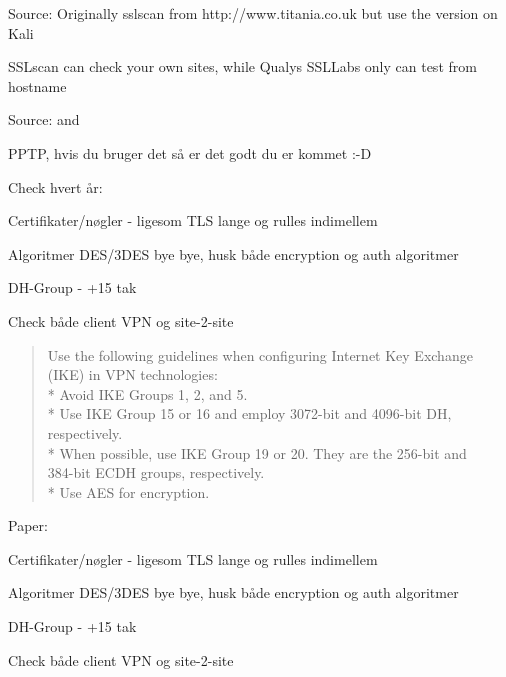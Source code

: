 \documentclass[Screen16to9,17pt]{foils}
\begin{document}
Source:
Originally sslscan from http://www.titania.co.uk
 but use the version on Kali

SSLscan can check your own sites, while Qualys SSLLabs only can test from hostname





Source:  and \\




\begin{list1}
\item PPTP, hvis du bruger det så er det godt du er kommet :-D
\item Check hvert år:
\begin{list2}
\item Certifikater/nøgler - ligesom TLS lange og rulles indimellem
\item Algoritmer DES/3DES bye bye, husk både encryption og auth algoritmer
\item DH-Group - +15 tak
\item Check både client VPN og site-2-site
\end{list2}
\end{list1}


\begin{quote}
  Use the following guidelines when configuring Internet Key Exchange (IKE) in VPN technologies:\\
* Avoid IKE Groups 1, 2, and 5.\\
* Use IKE Group 15 or 16 and employ 3072-bit and 4096-bit DH, respectively.\\
* When possible, use IKE Group 19 or 20. They are the 256-bit and \\
384-bit ECDH groups, respectively.\\
* Use AES for encryption.
\end{quote}
Paper:\\
{\small {}}

\begin{list2}
\item Certifikater/nøgler - ligesom TLS lange og rulles indimellem
\item Algoritmer DES/3DES bye bye, husk både encryption og auth algoritmer
\item DH-Group - +15 tak
\item Check både client VPN og site-2-site
\end{list2}
\end{document}
